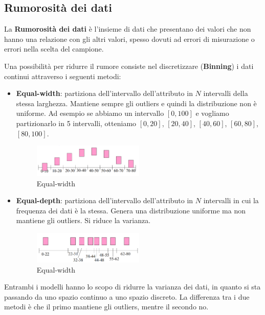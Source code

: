 \subsection{Rumorosità dei dati}
\begin{definizione} 
      La \textbf{Rumorosità dei dati} è l'insieme di dati che presentano dei
      valori che non hanno una relazione con gli altri valori, spesso dovuti ad
      errori di misurazione o errori nella scelta del campione.
\end{definizione}
Una possibilità per ridurre il rumore consiste nel discretizzare (\textbf{Binning})
i dati continui attraverso i seguenti metodi:
\begin{itemize}
      \item \textbf{Equal-width}: partiziona dell'intervallo dell'attributo in $N$
            intervalli della stessa larghezza. Mantiene sempre gli outliers e
            quindi la distribuzione non è uniforme.
            Ad esempio se abbiamo un intervallo $[0, 100]$ e vogliamo partizionarlo
            in 5 intervalli, otteniamo $[0, 20]$, $[20, 40]$, $[40, 60]$, $[60, 80]$,
            $[80, 100]$.
            \begin{figure}[!ht]
                  \centering
                  \includegraphics[width=0.5\textwidth]{./img/Preprocessing/equalwidth.png}
                  \caption{Equal-width}
                  \label{fig:equal-width}
            \end{figure}
      \item \textbf{Equal-depth}: partiziona dell'intervallo dell'attributo in $N$
            intervalli in cui la frequenza dei dati è la stessa. Genera una
            distribuzione uniforme ma non mantiene gli outliers. Si riduce la
            varianza.
            \begin{figure}[!ht]
                  \centering
                  \includegraphics[width=0.5\textwidth]{./img/Preprocessing/equaldepth.png}
                  \caption{Equal-width}
                  \label{fig:equal-depth}
            \end{figure}
\end{itemize}
Entrambi i modelli hanno lo scopo di ridurre la varianza dei dati, in quanto si
sta passando da uno spazio continuo a uno spazio discreto. La differenza tra i
due metodi è che il primo mantiene gli outliers, mentre il secondo no.
